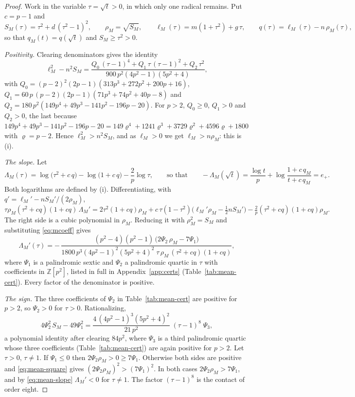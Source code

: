 \begin{proof}
Work in the variable $\tau=\sqrt t>0$, in which only one radical remains. Put $c=p-1$ and
\[ S_M(\tau)=\tau^{2}+d\,(\tau^{2}-1)^{2},\qquad \rho_M=\sqrt{S_M},\qquad
\ell_M(\tau)=m(1+\tau^{2})+g\,\tau,\qquad q(\tau)=\ell_M(\tau)-n\,\rho_M(\tau), \]
so that $q_M(t)=q(\sqrt t)$ and $S_M\ge\tau^{2}>0$.

\emph{Positivity.} Clearing denominators gives the identity
\begin{equation}\label{eq:mean-pos}
\ell_M^{2}-n^{2}S_M=\frac{Q_0\,(\tau-1)^{4}+Q_1\,\tau\,(\tau-1)^{2}+Q_2\,\tau^{2}}{900\,p^{2}(4p^{2}-1)(5p^{2}+4)},
\end{equation}
with $Q_0=(p-2)^{2}(2p-1)(313p^{3}+272p^{2}+200p+16)$,
$Q_1=60\,p\,(p-2)(2p-1)(71p^{3}+74p^{2}+40p-8)$ and
$Q_2=180\,p^{2}(149p^{4}+49p^{3}-141p^{2}-196p-20)$. For $p>2$, $Q_0\ge0$, $Q_1>0$ and $Q_2>0$, the
last because
$149p^{4}+49p^{3}-141p^{2}-196p-20=149\varrho^{4}+1241\varrho^{3}+3729\varrho^{2}+4596\varrho+1800$ with
$\varrho=p-2$. Hence $\ell_M^{2}>n^{2}S_M$, and as $\ell_M>0$ we get $\ell_M>n\rho_M$: this is (i).

\emph{The slope.} Let
\[ \Lambda_M(\tau)=\log\bigl(\tau^{2}+c\,q\bigr)-\log\bigl(1+c\,q\bigr)-\frac2p\log\tau ,
\qquad\text{so that}\qquad -\Lambda_M(\sqrt t)=\frac{\log t}{p}+\log\frac{1+c\,q_M}{t+c\,q_M}=e_+ . \]
Both logarithms are defined by (i). Differentiating, with $q'=\ell_M'-nS_M'/(2\rho_M)$,
\[ \tau\rho_M(\tau^{2}+cq)(1+cq)\,\Lambda_M'
=2\tau^{2}(1+cq)\rho_M+c\,\tau(1-\tau^{2})\bigl(\ell_M'\rho_M-\tfrac12nS_M'\bigr)
-\tfrac2p(\tau^{2}+cq)(1+cq)\rho_M . \]
The right side is a cubic polynomial in $\rho_M$. Reducing it with $\rho_M^{2}=S_M$ and substituting
\eqref{eq:mcoeff} gives
\begin{equation}\label{eq:mean-slope}
\Lambda_M'(\tau)=-\,\frac{(p^{2}-4)(p^{2}-1)\,\bigl(2\Psi_2\,\rho_M-7\Psi_1\bigr)}
{1800\,p^{3}(4p^{2}-1)^{2}(5p^{2}+4)^{2}\;\tau\,\rho_M\,(\tau^{2}+cq)(1+cq)} ,
\end{equation}
where $\Psi_1$ is a palindromic sextic and $\Psi_2$ a palindromic quartic in $\tau$ with coefficients in
$\mathbb Z[p^{2}]$, listed in full in Appendix~\ref{app:certs} (Table~\ref{tab:mean-cert}). Every factor
of the denominator is positive.

\emph{The sign.} The three coefficients of $\Psi_2$ in Table~\ref{tab:mean-cert} are positive for $p>2$,
so $\Psi_2>0$ for $\tau>0$. Rationalizing,
\begin{equation}\label{eq:mean-square}
4\Psi_2^{2}\,S_M-49\Psi_1^{2}=\frac{4\,(4p^{2}-1)^{3}(5p^{2}+4)^{2}}{21\,p^{2}}\;(\tau-1)^{8}\;\Psi_3 ,
\end{equation}
a polynomial identity after clearing $84p^{2}$, where $\Psi_3$ is a third palindromic quartic whose
three coefficients (Table~\ref{tab:mean-cert}) are again positive for $p>2$. Let $\tau>0$, $\tau\ne1$. If
$\Psi_1\le0$ then $2\Psi_2\rho_M>0\ge7\Psi_1$. Otherwise both sides are positive and \eqref{eq:mean-square}
gives $(2\Psi_2\rho_M)^{2}>(7\Psi_1)^{2}$. In both cases $2\Psi_2\rho_M>7\Psi_1$, and by
\eqref{eq:mean-slope} $\Lambda_M'<0$ for $\tau\neq1$. The factor $(\tau-1)^{8}$ is the contact of order
eight.


\end{proof}
